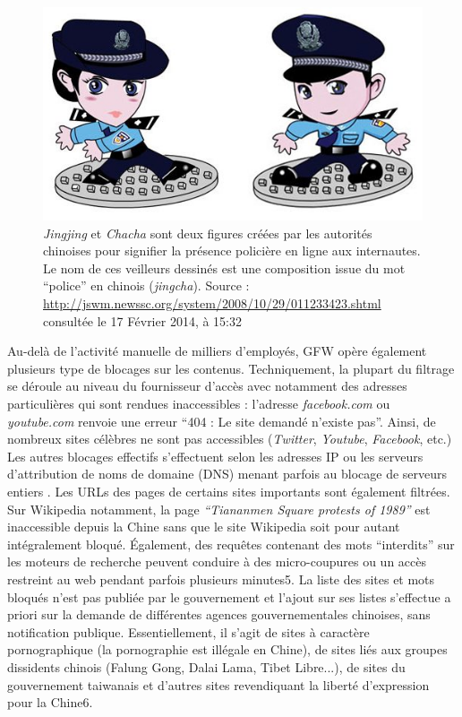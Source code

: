 \begin{figure}[ht]
    \centering
    \includegraphics{figures/chap1/jingcha.jpg}
    \caption[Jingjing et Chacha, les policiers de l'Internet chinois]{\textit{Jingjing} et \textit{Chacha} sont deux figures créées par les autorités chinoises pour signifier la présence policière en ligne aux internautes. Le nom de ces veilleurs dessinés est une composition issue du mot “police” en chinois (\textit{jingcha}). Source : \url{http://jswm.newssc.org/system/2008/10/29/011233423.shtml} consultée le 17 Février 2014, à 15:32}
    \label{fig:jingcha}
\end{figure}


Au-delà de l’activité manuelle de milliers d’employés, GFW opère également plusieurs type de blocages sur les contenus. Techniquement, la plupart du filtrage se déroule au niveau du fournisseur d’accès avec notamment des adresses particulières qui sont rendues inaccessibles : l’adresse \textit{facebook.com} ou \textit{youtube.com} renvoie une erreur “404 : Le site demandé n’existe pas”. Ainsi, de nombreux sites célèbres ne sont pas accessibles (\textit{Twitter}, \textit{Youtube}, \textit{Facebook}, etc.) Les autres blocages effectifs s’effectuent selon les adresses IP ou les serveurs d’attribution de noms de domaine (DNS) menant parfois au blocage de serveurs entiers \citep{Winter2012}. Les URLs des pages de certains sites importants sont également filtrées. Sur Wikipedia notamment, la page \textit{“Tiananmen Square protests of 1989”} est inaccessible depuis la Chine sans que le site Wikipedia soit pour autant intégralement bloqué. Également, des requêtes contenant des mots “interdits” sur les moteurs de recherche peuvent conduire à des micro-coupures ou un accès restreint au web pendant parfois plusieurs minutes5. La liste des sites et mots bloqués n’est pas publiée par le gouvernement et l’ajout sur ses listes s’effectue a priori sur la demande de différentes agences gouvernementales chinoises, sans notification publique. Essentiellement, il s’agit de sites à caractère pornographique (la pornographie est illégale en Chine), de sites liés aux groupes dissidents chinois (Falung Gong, Dalai Lama, Tibet Libre...), de sites du gouvernement taiwanais et d’autres sites revendiquant la liberté d’expression pour la Chine6.

